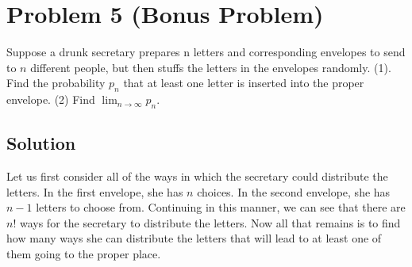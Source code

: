 \documentclass[10pt,a4paper]{article}
\theoremstyle{theorem}
\theoremstyle{definition}
\begin{document}
\section*{Problem 5 (Bonus Problem)}
Suppose a drunk secretary prepares n letters
and corresponding envelopes to send to $n$ different people,  but then stuffs the letters in the
envelopes randomly. (1). Find the probability $p_n$ that at least one letter is inserted into the
proper envelope. (2) Find $\lim_{n \to \infty} p_n$.

\subsection*{Solution}
Let us first consider all of the ways in which the secretary could distribute the letters. In the first envelope, she has $n$ choices.  In the second envelope, she has $n - 1$ letters to choose from. Continuing in this manner, we can see that there are $n!$ ways for the secretary to distribute the letters. Now all that remains is to find how many ways she can distribute the letters that will lead to at least one of them going to the proper place.
\end{document}

